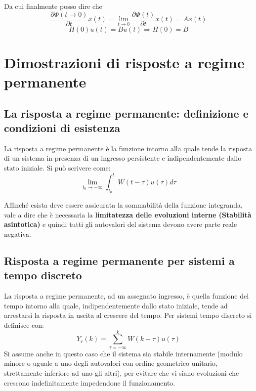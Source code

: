 \documentclass{article}
\begin{document}
Da cui finalmente posso dire che 
\[ \frac{\partial \Phi(t\to 0)}{\partial t}x(t) =\lim_{t\to 0}\frac{\partial \Phi(t)}{\partial t}x(t) = Ax(t) \]
\[ H(0)u(t) = Bu(t) \Rightarrow H(0) = B \]


























\section{Dimostrazioni di risposte a regime permanente}


\subsection{La risposta a regime permanente: definizione e condizioni di esistenza}
La risposta a regime permanente è la funzione intorno alla quale tende la risposta di un sistema
in presenza di un ingresso persistente e indipendentemente dallo stato iniziale.
Si può scrivere come:
\[\lim_ {t_0 \to -\infty} \int_{t_0}^{t} W(t-\tau)u(\tau) d\tau  \]

Affinché esista deve essere assicurata la sommabilità della funzione integranda,
vale a dire che è necessaria la \textbf{limitatezza delle evoluzioni interne (Stabilità asintotica)}
e quindi tutti gli autovalori del sistema devono avere parte reale negativa.



\subsection{Risposta a regime permanente per sistemi a tempo discreto}
La risposta a regime permanente, ad un assegnato ingresso, è quella funzione del tempo intorno alla quale, indipendentemente dallo stato iniziale,
tende ad arrestarsi la risposta in uscita al crescere del tempo.
Per sistemi tempo discreto si definisce con:
\[Y_r(k)=\sum_{\tau =- \infty}^{k} W(k-\tau)u(\tau) \]
Si assume anche in questo caso che il sistema sia stabile internamente (modulo minore o uguale a uno degli autovalori con ordine geometrico unitario,
strettamente inferiore ad uno gli altri), per evitare che vi siano evoluzioni che crescono
indefinitamente impedendone il funzionamento.
\end{document}
